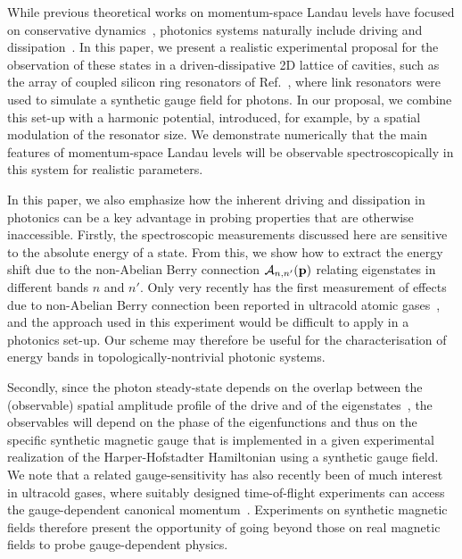 \documentclass[twocolumn, 10pt, aps, superscriptaddress, floatfix, showpacs, pra, citeautoscript]{revtex4-1}
\begin{document}
While previous theoretical works on momentum-space Landau levels have focused on conservative dynamics~\cite{price2014magnetic, Claassen_prl_2015}, photonics systems naturally include driving and dissipation~\cite{carusotto2013fluids}. In this paper, we present a realistic experimental proposal for the observation of these states in a driven-dissipative 2D lattice of cavities, such as the array of coupled silicon ring resonators of Ref.~\cite{hafezi2013imaging}, where link resonators were used to simulate a synthetic gauge field for photons. In our proposal, we combine this set-up with a harmonic potential, introduced, for example, by a spatial modulation of the resonator size. We demonstrate numerically that the main features of momentum-space Landau levels will be observable spectroscopically in this system for realistic parameters. 

In this paper, we also emphasize how the inherent driving and dissipation in photonics can be a key advantage in probing properties that are otherwise inaccessible. 
Firstly, the spectroscopic measurements discussed here are sensitive to the absolute energy of a state. From this, we show how to extract the energy shift due to the non-Abelian Berry connection $\mathcal{A}_{n,n'}({\bf p})$ relating eigenstates in different bands $n$ and $n'$. Only very recently has the first measurement of effects due to non-Abelian Berry connection been reported in ultracold atomic gases~\cite{Grusdt2014nonabelian,tracy2015arxiv}, and the approach used in this experiment would be difficult to apply in a photonics set-up. Our scheme may therefore be useful for the characterisation of energy bands in topologically-nontrivial photonic systems.

Secondly, since the photon steady-state depends on the overlap between the (observable) spatial amplitude profile of the drive and of the eigenstates~\cite{carusotto2013fluids}, the observables will depend on the phase of the eigenfunctions and thus on the specific synthetic magnetic gauge that is implemented in a given experimental realization of the Harper-Hofstadter Hamiltonian using a synthetic gauge field. We note that a related gauge-sensitivity has also recently been of much interest in ultracold gases, where suitably designed time-of-flight experiments can access the gauge-dependent canonical momentum~\cite{kennedy2015bec,spielman2011gauge,tomoki2015nv}. Experiments on synthetic magnetic fields therefore present the opportunity of going beyond those on real magnetic fields to probe gauge-dependent physics. 
\end{document}
